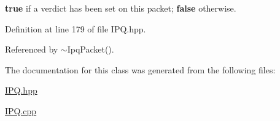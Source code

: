 {\bfseries true} if a verdict has been set on this packet; {\bfseries false} otherwise. 



\-Definition at line 179 of file \-I\-P\-Q.\-hpp.



\-Referenced by $\sim$\-Ipq\-Packet().



\-The documentation for this class was generated from the following files\-:\begin{DoxyCompactItemize}
\item 
\hyperlink{IPQ_8hpp}{\-I\-P\-Q.\-hpp}\item 
\hyperlink{IPQ_8cpp}{\-I\-P\-Q.\-cpp}\end{DoxyCompactItemize}
